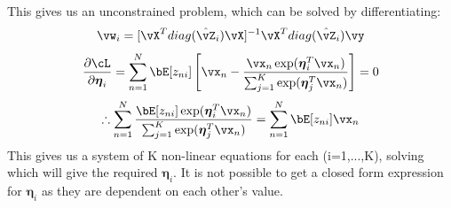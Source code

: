 \documentclass[a4paper,12pt]{article}
\begin{document}
\begin{mlsolution}
This gives us an unconstrained problem, which can be solved by differentiating:
\[
\vw_i=[\vX^Tdiag(\hat{\vZ}_i)\vX]^{-1}\vX^Tdiag(\hat{\vZ}_i)\vy
\]
\[
\frac{\partial\cL}{\partial\boldsymbol\eta_i}=\sum_{n=1}^N\bE[z_{ni}]\left[\vx_n-\frac{\vx_n\exp(\boldsymbol\eta_i^T\vx_n)}{\sum_{j=1}^K\exp(\boldsymbol\eta_j^T\vx_n)}\right]=0
\]   
\[
\therefore\sum_{n=1}^N\frac{\bE[z_{ni}]\exp(\boldsymbol\eta_i^T\vx_n)}{\sum_{j=1}^K\exp(\boldsymbol\eta_j^T\vx_n)}=\sum_{n=1}^N\bE[z_{ni}]\vx_n
\]
This gives us a system of K non-linear equations for each (i=1,...,K), solving which will give the required $\boldsymbol\eta_i$. It is not possible to get a closed form expression for $\boldsymbol\eta_i$ as they are dependent on each other's value.
\end{mlsolution}
    
\end{document}
